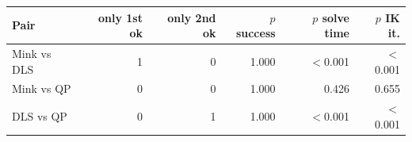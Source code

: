 \begin{tabular}{lrrrrr}
\toprule
Pair & only 1st ok & only 2nd ok & $p$ success & $p$ solve time & $p$ IK it.\\
\midrule
Mink vs DLS & 1 & 0 & 1.000 & $<$0.001 & $<$0.001\\
Mink vs QP & 0 & 0 & 1.000 & 0.426 & 0.655\\
DLS vs QP & 0 & 1 & 1.000 & $<$0.001 & $<$0.001\\
\bottomrule
\end{tabular}
